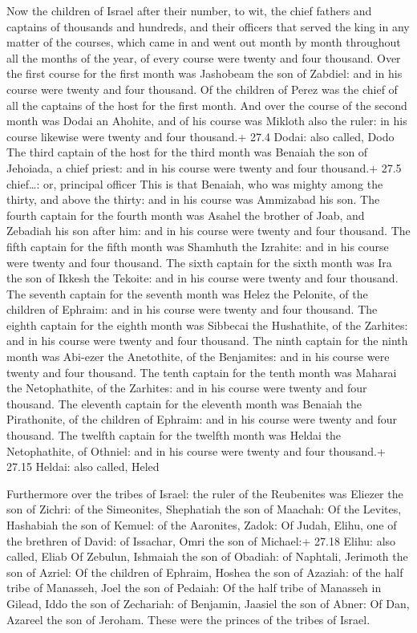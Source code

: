  Now the children of Israel after their number, to wit, the
chief fathers and captains of thousands and hundreds, and their officers
that served the king in any matter of the courses, which came in and
went out month by month throughout all the months of the year, of every
course were twenty and four thousand.  Over the first course
for the first month was Jashobeam the son of Zabdiel: and in his course
were twenty and four thousand.  Of the children of Perez was
the chief of all the captains of the host for the first month.
 And over the course of the second month was Dodai an
Ahohite, and of his course was Mikloth also the ruler: in his course
likewise were twenty and four thousand.+ 27.4 Dodai: also called, Dodo
 The third captain of the host for the third month was
Benaiah the son of Jehoiada, a chief priest: and in his course were
twenty and four thousand.+ 27.5 chief\ldots: or, principal officer
 This is that Benaiah, who was mighty among the thirty, and
above the thirty: and in his course was Ammizabad his son. 
The fourth captain for the fourth month was Asahel the brother of Joab,
and Zebadiah his son after him: and in his course were twenty and four
thousand.  The fifth captain for the fifth month was
Shamhuth the Izrahite: and in his course were twenty and four thousand.
 The sixth captain for the sixth month was Ira the son of
Ikkesh the Tekoite: and in his course were twenty and four thousand.
 The seventh captain for the seventh month was Helez the
Pelonite, of the children of Ephraim: and in his course were twenty and
four thousand.  The eighth captain for the eighth month was
Sibbecai the Hushathite, of the Zarhites: and in his course were twenty
and four thousand.  The ninth captain for the ninth month
was Abi-ezer the Anetothite, of the Benjamites: and in his course were
twenty and four thousand.  The tenth captain for the tenth
month was Maharai the Netophathite, of the Zarhites: and in his course
were twenty and four thousand.  The eleventh captain for
the eleventh month was Benaiah the Pirathonite, of the children of
Ephraim: and in his course were twenty and four thousand. 
The twelfth captain for the twelfth month was Heldai the Netophathite,
of Othniel: and in his course were twenty and four thousand.+ 27.15
Heldai: also called, Heled

 Furthermore over the tribes of Israel: the ruler of the
Reubenites was Eliezer the son of Zichri: of the Simeonites, Shephatiah
the son of Maachah:  Of the Levites, Hashabiah the son of
Kemuel: of the Aaronites, Zadok:  Of Judah, Elihu, one of
the brethren of David: of Issachar, Omri the son of Michael:+ 27.18
Elihu: also called, Eliab  Of Zebulun, Ishmaiah the son of
Obadiah: of Naphtali, Jerimoth the son of Azriel:  Of the
children of Ephraim, Hoshea the son of Azaziah: of the half tribe of
Manasseh, Joel the son of Pedaiah:  Of the half tribe of
Manasseh in Gilead, Iddo the son of Zechariah: of Benjamin, Jaasiel the
son of Abner:  Of Dan, Azareel the son of Jeroham. These
were the princes of the tribes of Israel.

